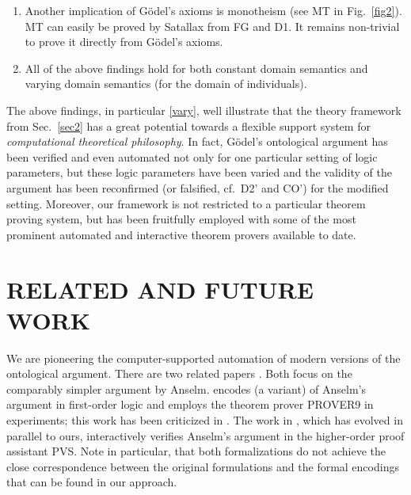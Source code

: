 \documentclass{ecai2014}
\begin{document}
{\begin{enumerate}
\item Another implication of G{\"o}del's axioms is monotheism (see MT
  in Fig.~\ref{fig2}). MT can easily be proved by Satallax from FG and
  D1. It remains non-trivial to prove it directly from
  G{\"o}del's axioms.
\item \label{vary} All of the above findings hold for both constant domain semantics and varying domain semantics (for the domain of individuals).
\end{enumerate}

The above findings, in particular \eqref{vary}, well illustrate that
the theory framework from Sec.~\ref{sec2} has a great potential
towards a flexible support system for \emph{computational theoretical
  philosophy}. In fact, G\"odel's ontological argument has been
verified and even automated not only for one particular setting of
logic parameters, but these logic parameters have been varied and the
validity of the argument has been reconfirmed (or falsified, cf.~D2'
and CO') for the modified setting.  Moreover, our framework is not
restricted to a particular theorem proving system, but has been
fruitfully employed with some of the most prominent automated and
interactive theorem provers available to date.



\section{RELATED AND FUTURE WORK}\label{sec5}
We are pioneering the computer-supported automation of modern versions
of the ontological argument. There are two related papers
\cite{oppenheimera11,rushby13}. Both focus on the comparably simpler
argument by Anselm. \cite{oppenheimera11} encodes (a variant) of
Anselm's argument in first-order logic and employs the theorem prover
PROVER9 in experiments; this work has been criticized in
\cite{garbacz12:_prover_simpl_expal_away}. The work in
\cite{rushby13}, which has evolved in parallel to ours, interactively
verifies Anselm's argument in the higher-order proof assistant
PVS. Note in particular, that both formalizations do not achieve the
close correspondence between the original formulations and the formal
encodings that can be found in our approach.

}
\end{document}
